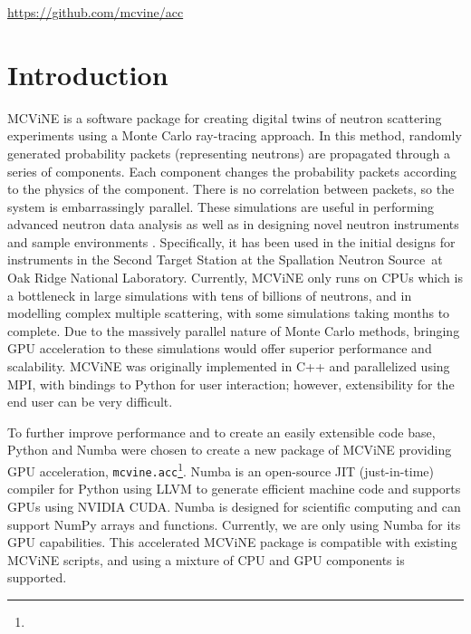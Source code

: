 

\urldef{\accrepo}\url{https://github.com/mcvine/acc}

\section{Introduction}

MCViNE\cite{lin2016mcvine,Lin_2019} is a software package for creating digital twins of neutron scattering experiments using a Monte Carlo ray-tracing approach. 
In this method, randomly generated probability packets (representing neutrons) are propagated through a series of components. Each component changes the probability packets according to the physics of the component. 
There is no correlation between packets, so the system is embarrassingly parallel.
These simulations are useful in performing advanced neutron data analysis \cite{lin2022super,islam2019super,sala2022ferrimagnetic,do2022damped,leiner2019frustrated,lin2014UN} as well as in designing novel neutron instruments\,\cite{mamontov2022bwaves,an2022menus,sala2022chess,garlea2022verdi,leighton2022ewald,liu2022pioneer,qian2022centaur,changwoo2022expanse,ankner2023cinematic,hassina2023cupi2d,linjiao2023guide_misalignment} and sample environments \cite{stone2019design,niedziela2017design}. Specifically, it has been used in the initial designs for instruments in the Second Target Station at the Spallation Neutron Source\,\cite{mason2006spallation} at Oak Ridge National Laboratory. 
Currently, MCViNE only runs on CPUs which is a bottleneck in large simulations with tens of billions of neutrons, and in modelling complex multiple scattering, with some simulations taking months to complete. Due to the massively parallel nature of Monte Carlo methods, bringing GPU acceleration to these simulations would offer superior performance and scalability. MCViNE was originally implemented in C++ and parallelized using MPI, with bindings to Python for user interaction; however, extensibility for the end user can be very difficult.

To further improve performance and to create an easily extensible code base, Python and Numba\cite{lam2015numba} were chosen to create a new package of MCViNE providing GPU acceleration, \texttt{mcvine.acc}\footnote{\accrepo}. Numba is an open-source JIT (just-in-time) compiler for Python using LLVM to generate efficient machine code and supports GPUs using NVIDIA CUDA. Numba is designed for scientific computing and can support NumPy arrays and functions. Currently, we are only using Numba for its GPU capabilities. This accelerated MCViNE package is compatible with existing MCViNE scripts, and using a mixture of CPU and GPU components is supported.

